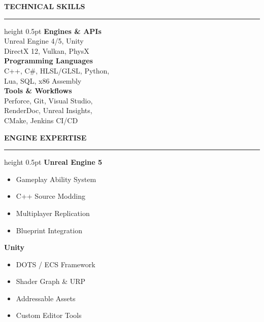 \documentclass[10pt]{article}
\begin{document}
\begin{minipage}[t]{0.34\textwidth}
    \begin{tcolorbox}
        {\large\bfseries\textcolor{primary}{TECHNICAL SKILLS}}
        \vspace{2pt}
        \hrule height 0.5pt\relax
        \vspace{6pt}
        \textbf{Engines \& APIs}\\
        Unreal Engine 4/5, Unity\\
        DirectX 12, Vulkan, PhysX\\
        
        \vspace{4pt}
        \textbf{Programming Languages}\\
        C++, C\#, HLSL/GLSL, Python,\\
        Lua, SQL, x86 Assembly\\
        
        \vspace{4pt}
        \textbf{Tools \& Workflows}\\
        Perforce, Git, Visual Studio,\\
        RenderDoc, Unreal Insights,\\
        CMake, Jenkins CI/CD
    \end{tcolorbox}
    
    \vspace{8pt}
    
    \begin{tcolorbox}
        {\large\bfseries\textcolor{primary}{ENGINE EXPERTISE}}
        \vspace{2pt}
        \hrule height 0.5pt\relax
        \vspace{6pt}
        \textbf{Unreal Engine 5}
        \begin{itemize}[leftmargin=8pt, label=\textcolor{accent}{\tiny$\circ$}, noitemsep, topsep=1pt]
            \item Gameplay Ability System
            \item C++ Source Modding
            \item Multiplayer Replication
            \item Blueprint Integration
        \end{itemize}
        
        \vspace{4pt}
        \textbf{Unity}
        \begin{itemize}[leftmargin=8pt, label=\textcolor{accent}{\tiny$\circ$}, noitemsep, topsep=1pt]
            \item DOTS / ECS Framework
            \item Shader Graph \& URP
            \item Addressable Assets
            \item Custom Editor Tools
        \end{itemize}
    \end{tcolorbox}
    

\end{minipage}
\end{document}
